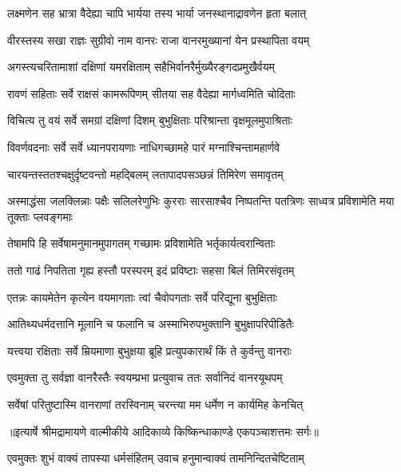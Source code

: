\twolineshloka
{लक्ष्मणेन सह भ्रात्रा वैदेह्या चापि भार्यया}
{तस्य भार्या जनस्थानाद्रावणेन हृता बलात्} %

\twolineshloka
{वीरस्तस्य सखा राज्ञः सुग्रीवो नाम वानरः}
{राजा वानरमुख्यानां येन प्रस्थापिता वयम्} %

\twolineshloka
{अगस्त्यचरितामाशां दक्षिणां यमरक्षिताम्}
{सहैभिर्वानरैर्मुख्यैरङ्गदप्रमुखैर्वयम्} %

\twolineshloka
{रावणं सहिताः सर्वे राक्षसं कामरूपिणम्}
{सीतया सह वैदेह्या मार्गध्वमिति चोदिताः} %

\twolineshloka
{विचित्य तु वयं सर्वे समग्रां दक्षिणां दिशम्}
{बुभुक्षिताः परिश्रान्ता वृक्षमूलमुपाश्रिताः} %

\twolineshloka
{विवर्णवदनाः सर्वे सर्वे ध्यानपरायणाः}
{नाधिगच्छामहे पारं मग्नाश्चिन्तामहार्णवे} %

\twolineshloka
{चारयन्तस्ततश्चक्षुर्दृष्टवन्तो महद्बिलम्}
{लतापादपसञ्छन्नं तिमिरेण समावृतम्} %

\threelineshloka
{अस्माद्धंसा जलक्लिन्नाः पक्षैः सलिलरेणुभिः}
{कुरराः सारसाश्चैव निष्पतन्ति पतत्रिणः}
{साध्वत्र प्रविशामेति मया तूक्ताः प्लवङ्गमाः} %

\twolineshloka
{तेषामपि हि सर्वेषामनुमानमुपागतम्}
{गच्छामः प्रविशामेति भर्तृकार्यत्वरान्विताः} %

\twolineshloka
{ततो गाढं निपतिता गृह्य हस्तौ परस्परम्}
{इदं प्रविष्टाः सहसा बिलं तिमिरसंवृतम्} %

\twolineshloka
{एतन्नः कायमेतेन कृत्येन वयमागताः}
{त्वां चैवोपगताः सर्वे परिद्यूना बुभुक्षिताः} %

\twolineshloka
{आतिथ्यधर्मदत्तानि मूलानि च फलानि च}
{अस्माभिरुपभुक्तानि बुभुक्षापरिपीडितैः} %

\twolineshloka
{यत्त्वया रक्षिताः सर्वे म्रियमाणा बुभुक्षया}
{ब्रूहि प्रत्युपकारार्थं किं ते कुर्वन्तु वानराः} %

\twolineshloka
{एवमुक्ता तु सर्वज्ञा वानरैस्तैः स्वयम्प्रभा}
{प्रत्युवाच ततः सर्वानिदं वानरयूथपम्} %

\twolineshloka
{सर्वेषां परितुष्टास्मि वानराणां तरस्विनाम्}
{चरन्त्या मम धर्मेण न कार्यमिह केनचित्} %


{॥इत्यार्षे श्रीमद्रामायणे वाल्मीकीये आदिकाव्ये किष्किन्धाकाण्डे एकपञ्चाशत्तमः सर्गः॥}


\twolineshloka
{एवमुक्तः शुभं वाक्यं तापस्या धर्मसंहितम्}
{उवाच हनुमान्वाक्यं तामनिन्दितचेष्टिताम्} %

